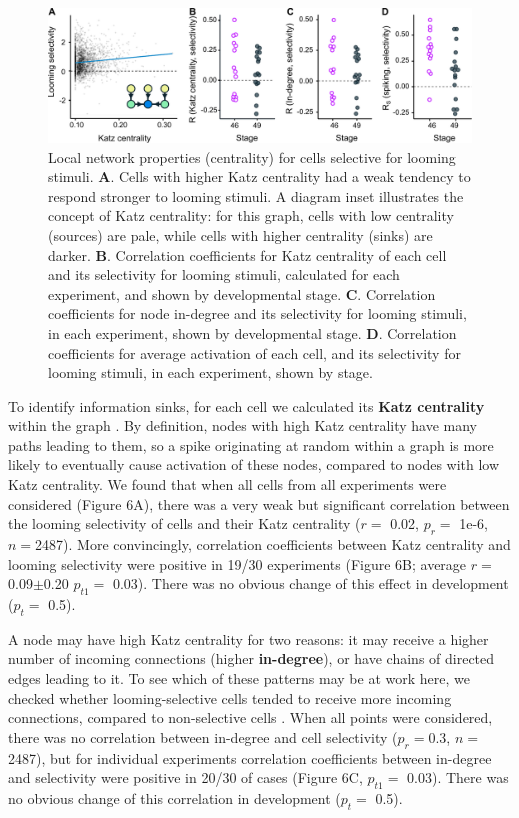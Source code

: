 \documentclass{article}
\begin{document}
\begin{figure}[t!]
\includegraphics[width=\linewidth]{fig6.pdf}
\caption{
Local network properties (centrality) for cells selective for looming stimuli. \textbf{A}. Cells with higher Katz centrality had a weak tendency to respond stronger to looming stimuli. A diagram inset illustrates the concept of Katz centrality: for this graph, cells with low centrality (sources) are pale, while cells with higher centrality (sinks) are darker. \textbf{B}. Correlation coefficients for Katz centrality of each cell and its selectivity for looming stimuli, calculated for each experiment, and shown by developmental stage. \textbf{C}. Correlation coefficients for node in-degree and its selectivity for looming stimuli, in each experiment, shown by developmental stage. \textbf{D}. Correlation coefficients for average activation of each cell, and its selectivity for looming stimuli, in each experiment, shown by stage. }
\end{figure}

To identify information sinks, for each cell we calculated its \textbf{Katz centrality} within the graph \citep{katz1953original, fletcher2018katz}. By definition, nodes with high Katz centrality have many paths leading to them, so a spike originating at random within a graph is more likely to eventually cause activation of these nodes, compared to nodes with low Katz centrality. We found that when all cells from all experiments were considered (Figure 6A), there was a very weak but significant correlation between the looming selectivity of cells and their Katz centrality ($r =$ 0.02, $p_{r} =$ 1e-6, $n=$2487). More convincingly, correlation coefficients between Katz centrality and looming selectivity were positive in 19/30 experiments (Figure 6B; average $r=$ 0.09$\pm$0.20 $p_{t1}=$ 0.03). There was no obvious change of this effect in development ($p_t=$ 0.5).

A node may have high Katz centrality for two reasons: it may receive a higher number of incoming connections (higher \textbf{in-degree}), or have chains of directed edges leading to it. To see which of these patterns may be at work here, we checked whether looming-selective cells tended to receive more incoming connections, compared to non-selective cells \citep{litwin2014assemblies}. When all points were considered, there was no correlation between in-degree and cell selectivity ($p_{r}=$0.3, $n=$ 2487), but for individual experiments correlation coefficients between in-degree and selectivity were positive in 20/30 of cases (Figure 6C, $p_{t1}=$ 0.03). There was no obvious change of this correlation in development ($p_t=$ 0.5).
\end{document}
